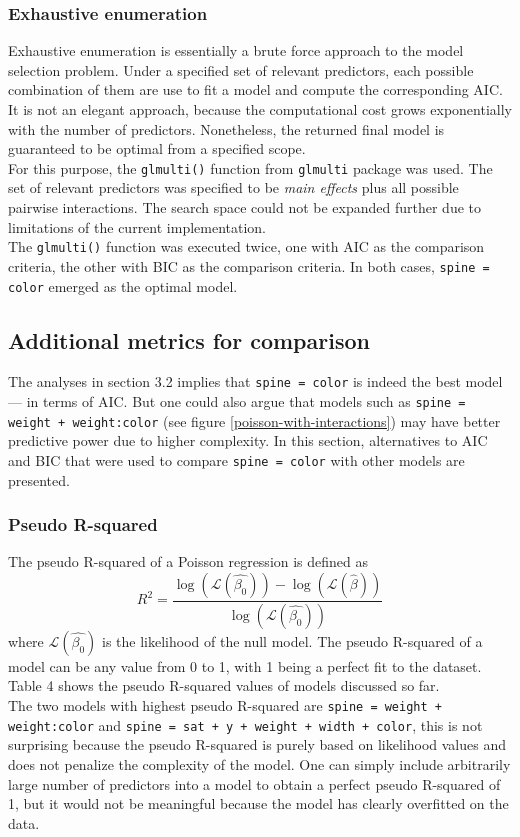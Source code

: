 \documentclass[a4paper, 12pt]{article}
\begin{document}
\subsubsection{Exhaustive enumeration}
Exhaustive enumeration is essentially a brute force approach to the model selection problem. Under a specified set of relevant predictors, each possible combination of them are use to fit a model and compute the corresponding AIC. It is not an elegant approach, because the computational cost grows exponentially with the number of predictors. Nonetheless, the returned final model is guaranteed to be optimal from a specified scope. \\
\indent For this purpose, the \texttt{glmulti()} function from \texttt{glmulti} package \cite{calcagno_mazancourt_2010} was used. The set of relevant predictors was specified to be \textit{main effects} plus all possible pairwise interactions. The search space could not be expanded further due to limitations of the current implementation. \\
\indent The \texttt{glmulti()} function was executed twice, one with AIC as the comparison criteria, the other with BIC as the comparison criteria. In both cases, \texttt{spine = color} emerged as the optimal model.

\subsection{Additional metrics for comparison}
The analyses in section 3.2 implies that \texttt{spine = color} is indeed the best model --- in terms of AIC. But one could also argue that models such as \texttt{spine = weight + weight:color} (see figure \ref{poisson-with-interactions}) may have better predictive power due to higher complexity. In this section, alternatives to AIC and BIC that were used to compare \texttt{spine = color} with other models are presented.

\subsubsection{Pseudo R-squared}
\noindent The pseudo R-squared of a Poisson regression is defined as 
$$ R^2 = \frac{\log(\mathcal{L}(\hat{\beta_0})) - \log(\mathcal{L}(\hat{\beta}))}{\log(\mathcal{L}(\hat{\beta_0}))}$$
where $ \mathcal{L}(\hat{\beta_0}) $ is the likelihood of the null model. The pseudo R-squared of a model can be any value from 0 to 1, with 1 being a perfect fit to the dataset. Table 4 shows the pseudo R-squared values of models discussed so far. \\
\indent The two models with highest pseudo R-squared are \texttt{spine = weight + weight:color} and \texttt{spine = sat + y + weight + width + color}, this is not surprising because the pseudo R-squared is purely based on likelihood values and does not penalize the complexity of the model. One can simply include arbitrarily large number of predictors into a model to obtain a perfect pseudo R-squared of 1, but it would not be meaningful because the model has clearly overfitted on the data. 
\end{document}
